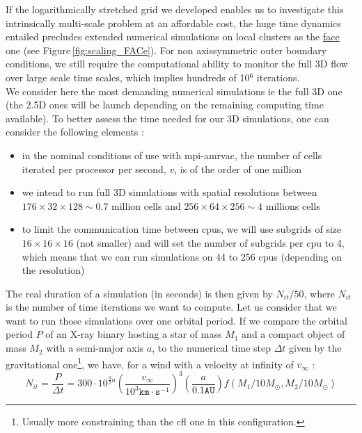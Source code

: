 \documentclass[
    a4paper, 
    12pt, onecolumn,
]{article}
\begin{document}
\indent \indent If the logarithmically stretched grid we developed enables us to investigate this intrinsically multi-scale problem at an affordable cost, the huge time dynamics entailed precludes extended numerical simulations on local clusters as the \href{http://www.apc.univ-paris7.fr/FACe/en/cluster-arago}{{\sc fac}e} one (see Figure\,\ref{fig:scaling_FACe}). For non axissymmetric outer boundary conditions, we still require the computational ability to monitor the full 3D flow over large scale time scales, which implies hundreds of 10$^6$ iterations.\\
\indent We consider here the most demanding numerical simulations ie the full 3D one (the 2.5D ones will be launch depending on the remaining computing time available). To better assess the time needed for our 3D simulations, one can consider the following elements :
\begin{itemize}
\item in the nominal conditions of use with {\sc mpi}-{\sc amrvac}, the number of cells iterated per processor per second, $v$, is of the order of one million
\item we intend to run full 3D simulations with spatial resolutions between $176\times 32\times 128 \sim 0.7$ million cells and $256\times 64\times 256 \sim 4$ millions cells
\item to limit the communication time between {\sc cpu}s, we will use subgrids of size $16\times 16\times 16$ (not smaller) and will set the number of subgrids per {\sc cpu} to 4, which means that we can run simulations on 44 to 256 {\sc cpu}s (depending on the resolution)
\end{itemize}
The real duration of a simulation (in seconds) is then given by $N_{it}/50$, where $N_{it}$ is the number of time iterations we want to compute. Let us consider that we want to run those simulations over one orbital period. If we compare the orbital period $P$ of an X-ray binary hosting a star of mass $M_1$ and a compact object of mass $M_2$ with a semi-major axis $a$, to the numerical time step $\Delta t$ given by the gravitational one\footnote{Usually more constraining than the {\sc cfl} one in this configuration.}, we have, for a wind with a velocity at infinity of $v_{\infty}$ : 
\begin{equation}
N_{it}=\frac{P}{\Delta t}=300\cdot 10^{\frac{3}{2}n} \left(\frac{v_{\infty}}{10^3\texttt{km}\cdot\texttt{s}^{-1}}\right)^3
 \left(\frac{a}{0.1\texttt{AU}}\right) f(M_1/10M_{\odot},M_2/10M_{\odot})
\end{equation}
\end{document}
